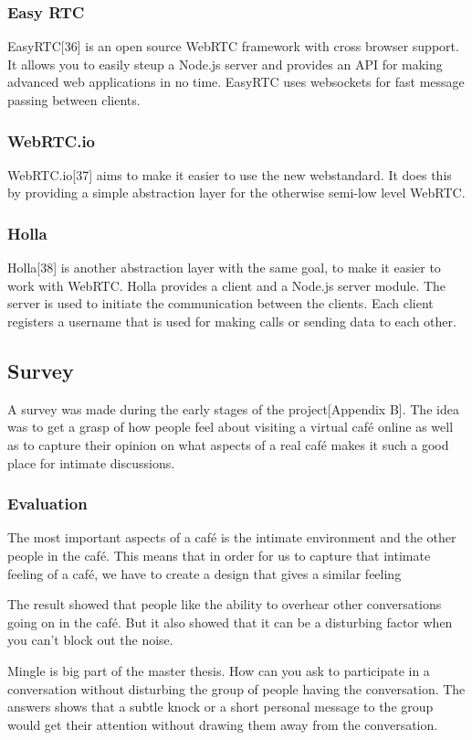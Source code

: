 \documentclass[12pt, titlepage]{article}
\begin{document}
\subsubsection{Easy RTC}
EasyRTC[36] is an open source WebRTC framework with cross browser support. It allows you to easily steup a Node.js server and provides an API for making advanced web applications in no time. EasyRTC uses websockets for fast message passing between clients.
\subsubsection{WebRTC.io}
WebRTC.io[37] aims to make it easier to use the new webstandard. It does this by providing a simple abstraction layer for the otherwise semi-low level WebRTC.
\subsubsection{Holla}
Holla[38] is another abstraction layer with the same goal, to make it easier to work with WebRTC. Holla provides a client and a Node.js server module. The server is used to initiate the communication between the clients. Each client registers a username that is used for making calls or sending data to each other.
\subsection{Survey}
A survey was made during the early stages of the project[Appendix B]. The idea was to get a grasp of how people feel about visiting a virtual café online as well as to capture their opinion on what aspects of a real café makes it such a good place for intimate discussions.
\subsubsection{Evaluation}
The most important aspects of a café is the intimate environment and the other people in the café. This means that in order for us to capture that intimate feeling of a café, we have to create a design that gives a similar feeling

The result showed that people like the ability to overhear other conversations going on in the café. But it also showed that it can be a disturbing factor when you can't block out the noise.

Mingle is big part of the master thesis. How can you ask to participate in a conversation without disturbing the group of people having the conversation. The answers shows that a subtle knock or a short personal message to the group would get their attention without drawing them away from the conversation.
\end{document}
